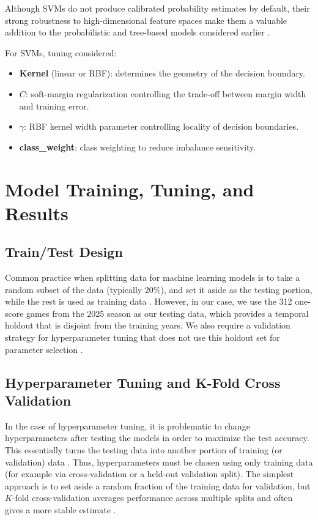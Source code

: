 \documentclass[11pt]{amsart}
\theoremstyle{definition}                  %
\theoremstyle{remark}                       %
\numberwithin{equation}{section}
\begin{document}
Although SVMs do not produce calibrated probability estimates by default, their strong robustness to high-dimensional feature spaces make them a valuable addition to the probabilistic and tree-based models considered earlier \cite{cortes1995support,hastie2009elements}.

For SVMs, tuning considered:
\begin{itemize}
    \item \textbf{Kernel} (linear or RBF): determines the geometry of the decision boundary.
    \item \textbf{$C$}: soft-margin regularization controlling the trade-off between margin width and training error.
    \item \textbf{$\gamma$}: RBF kernel width parameter controlling locality of decision boundaries.
    \item \textbf{class\_weight}: class weighting to reduce imbalance sensitivity.
\end{itemize}

\section{Model Training, Tuning, and Results}
\subsection{Train/Test Design}
Common practice when splitting data for machine learning models is to take a random subset of the data (typically 20\%), and set it aside as the testing portion, while the rest is used as training data \cite{james2021introduction, kuhn2013applied}. However, in our case, we use the 312 one-score games from the 2025 season as our testing data, which provides a temporal holdout that is disjoint from the training years. We also require a validation strategy for hyperparameter tuning that does not use this holdout set for parameter selection \cite{kuhn2013applied, hastie2009elements}.

\subsection{Hyperparameter Tuning and K-Fold Cross Validation}
In the case of hyperparameter tuning, it is problematic to change hyperparameters after testing the models in order to maximize the test accuracy. This essentially turns the testing data into another portion of training (or validation) data \cite{kuhn2013applied}. Thus, hyperparameters must be chosen using only training data (for example via cross-validation or a held-out validation split). The simplest approach is to set aside a random fraction of the training data for validation, but $K$-fold cross-validation averages performance across multiple splits and often gives a more stable estimate \cite{arlot2010survey, hastie2009elements}.
\end{document}
